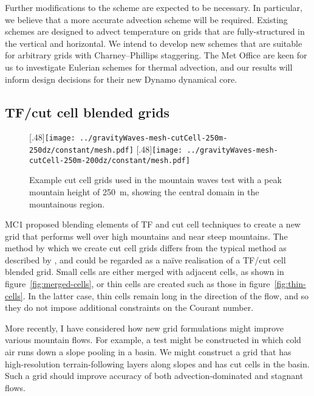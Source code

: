 \documentclass[a4paper]{article}
\begin{document}
Further modifications to the scheme are expected to be necessary.  In particular, we believe that a more accurate advection scheme will be required.
Existing schemes are designed to advect temperature on grids that are fully-structured in the vertical and horizontal.  We intend to develop new schemes that are suitable for arbitrary grids with Charney--Phillips staggering.
The Met Office are keen for us to investigate Eulerian schemes for thermal advection, and our results will inform design decisions for their new Dynamo dynamical core.  

\subsection*{TF/cut cell blended grids}
\begin{figure}
	\centering
	[.48\linewidth]{\texttt{[image: ../gravityWaves-mesh-cutCell-250m-250dz/constant/mesh.pdf]}}
	[.48\linewidth]{\texttt{[image: ../gravityWaves-mesh-cutCell-250m-200dz/constant/mesh.pdf]}}
%
	\caption{Example cut cell grids used in the mountain waves test with a peak mountain height of \SI{250}{\meter}, showing the central domain in the mountainous region.}
	\label{fig:cutCell-grids}
\end{figure}
MC1 proposed blending elements of TF and cut cell techniques to create a new grid that performs well over high mountains and near steep mountains.
The method by which we create cut cell grids differs from the typical method as described by \citet{adcroft1997}, and could be regarded as a na\"{i}ve realisation of a TF/cut cell blended grid.  Small cells are either merged with adjacent cells, as shown in figure~\ref{fig:merged-cells}, or thin cells are created such as those in figure~\ref{fig:thin-cells}.  In the latter case, thin cells remain long in the direction of the flow, and so they do not impose additional constraints on the Courant number.  

More recently, I have considered how new grid formulations might improve various mountain flows.  For example, a test might be constructed in which cold air runs down a slope pooling in a basin.  We might construct a grid that has high-resolution terrain-following layers along slopes and has cut cells in the basin.  Such a grid should improve accuracy of both advection-dominated and stagnant flows.
\end{document}
